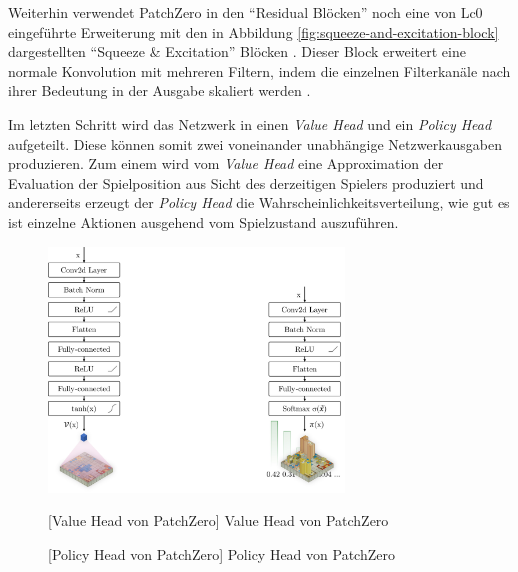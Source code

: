 \vspace*{-10cm}
\pagebreak

Weiterhin verwendet PatchZero in den \enquote{Residual Blöcken} noch eine von \ac{Lc0} eingeführte Erweiterung mit den in Abbildung \ref{fig:squeeze-and-excitation-block} dargestellten \enquote{Squeeze \& Excitation} Blöcken \cite{2020.Lc0NetworkTopology}. Dieser Block erweitert eine normale Konvolution mit mehreren Filtern, indem die einzelnen Filterkanäle nach ihrer Bedeutung in der Ausgabe skaliert werden \cite[S. 1]{2019.SqueezeandExcitation}.

Im letzten Schritt wird das Netzwerk in einen \emph{Value Head} und ein \emph{Policy Head} aufgeteilt. Diese können somit zwei voneinander unabhängige Netzwerkausgaben produzieren. Zum einem wird vom \emph{Value Head} eine Approximation der Evaluation der Spielposition aus Sicht des derzeitigen Spielers produziert und andererseits erzeugt der \emph{Policy Head} die Wahrscheinlichkeitsverteilung, wie gut es ist einzelne Aktionen ausgehend vom Spielzustand auszuführen.

\vspace*{-0.55cm}
\begin{figure}[!ht]
    \centering
    \includegraphics[width=0.7\textwidth]{res/pictures/value-and-policy-head.pdf}
    \\
    \begin{minipage}{.49\textwidth}
        \centering
        [Value Head von PatchZero]{\unskip}
        Value Head von PatchZero
        \label{fig:value-head}
    \end{minipage}
    \hfill
    \begin{minipage}{.49\textwidth}
        \centering
        [Policy Head von PatchZero]{\unskip}
        Policy Head von PatchZero
        \label{fig:policy-head}
    \end{minipage}
\end{figure}

